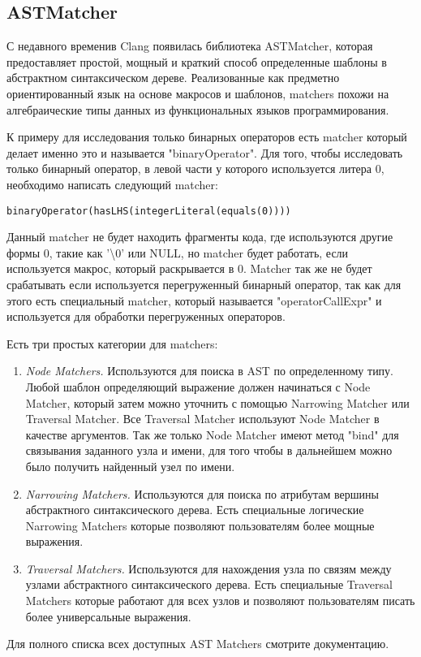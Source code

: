 \subsection*{ASTMatcher}
С недавного временив Clang появилась библиотека ASTMatcher, которая предоставляет простой, мощный и
краткий способ определенные шаблоны в абстрактном синтаксическом дереве. Реализованные как
предметно ориентированный язык на основе макросов и шаблонов, matchers похожи на алгебраические 
типы данных из функциональных языков программирования.

К примеру для исследования только бинарных операторов есть matcher который делает именно это и называется 
"binaryOperator". Для того, чтобы исследовать только бинарный оператор, в левой части у которого 
используется литера 0, необходимо написать следующий matcher: 
\begin{lstlisting}
binaryOperator(hasLHS(integerLiteral(equals(0))))
\end{lstlisting}
Данный matcher не будет находить фрагменты кода, где используются другие формы 0, такие как '\textbackslash0' или NULL,
но matcher будет работать, если используется макрос, который раскрывается в 0. Matcher так же 
не будет срабатывать если используется перегруженный бинарный оператор, так как для этого 
есть специальный matcher, который называется "operatorCallExpr" и используется для обработки 
перегруженных операторов. 

Есть три простых категории для matchers:
\begin{enumerate}
	\item \textit{Node Matchers.} Используются для поиска в AST по определенному типу. Любой шаблон
определяющий выражение должен начинаться с Node Matcher, который затем можно уточнить с помощью
Narrowing Matcher или Traversal Matcher. Все Traversal Matcher используют Node Matcher в качестве аргументов.
Так же только Node Matcher имеют метод "bind" для связывания заданного узла и имени, для того чтобы в дальнейшем
можно было получить найденный узел по имени.
	\item \textit{Narrowing Matchers.} Используются для поиска по атрибутам вершины абстрактного
синтаксического дерева. Есть специальные логические Narrowing Matchers которые позволяют 
пользователям более мощные выражения. 
	\item \textit{Traversal Matchers.} Используются для нахождения узла по связям между узлами 
абстрактного синтаксического дерева. Есть специальные Traversal Matchers которые работают для 
всех узлов и позволяют пользователям писать более универсальные выражения.
\end{enumerate}
Для полного списка всех доступных AST Matchers смотрите документацию.

